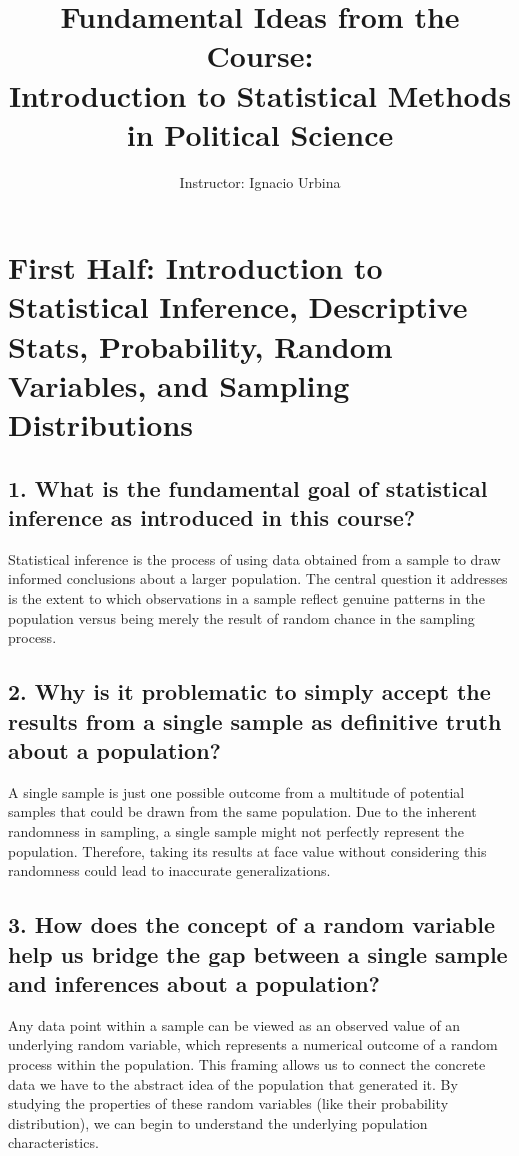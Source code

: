 \documentclass[12pt]{article}
\title{\vspace{-2cm}Fundamental Ideas from the Course: \\ \large Introduction to Statistical Methods in Political Science}
\author{Instructor: Ignacio Urbina}
\date{}
\begin{document}
\maketitle
{}

\section*{First Half: Introduction to Statistical Inference, Descriptive Stats, Probability, Random Variables, and Sampling Distributions}

\subsection*{1. What is the fundamental goal of statistical inference as introduced in this course?}
Statistical inference is the process of using data obtained from a sample to draw informed conclusions about a larger population. The central question it addresses is the extent to which observations in a sample reflect genuine patterns in the population versus being merely the result of random chance in the sampling process.

\subsection*{2. Why is it problematic to simply accept the results from a single sample as definitive truth about a population?}
A single sample is just one possible outcome from a multitude of potential samples that could be drawn from the same population. Due to the inherent randomness in sampling, a single sample might not perfectly represent the population. Therefore, taking its results at face value without considering this randomness could lead to inaccurate generalizations.

\subsection*{3. How does the concept of a random variable help us bridge the gap between a single sample and inferences about a population?}
Any data point within a sample can be viewed as an observed value of an underlying random variable, which represents a numerical outcome of a random process within the population. This framing allows us to connect the concrete data we have to the abstract idea of the population that generated it. By studying the properties of these random variables (like their probability distribution), we can begin to understand the underlying population characteristics.
\end{document}

